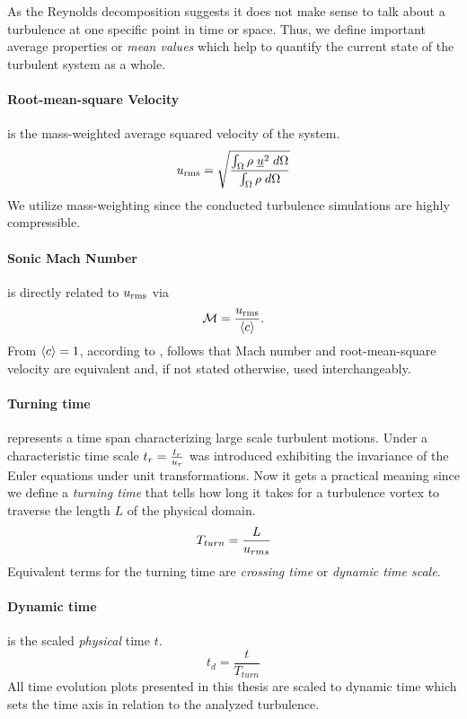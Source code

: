 As the Reynolds decomposition suggests it does not make sense to talk about a
turbulence at one specific point in time or space. Thus, we define important
average properties or \emph{mean values} which help to quantify the current
state of the turbulent system as a whole.

\paragraph{Root-mean-square Velocity}
is the mass-weighted average squared velocity of the system.
\begin{equation}
    u_{\text{rms}} = \sqrt{\frac{\int_\Omega \rho \; \underline{u}^2 \; d\Omega}{\int_\Omega \rho \; d\Omega}}
\end{equation}
We utilize mass-weighting since the conducted turbulence
simulations are highly compressible.

\paragraph{Sonic Mach Number}
is directly related to $u_{\text{rms}}$ via
\begin{equation}
\mathcal{M} = \frac{u_{\text{rms}}}{\left\langle c\right\rangle}.
\end{equation}
From $\left\langle c\right\rangle = 1$, according to , follows that
Mach number and root-mean-square velocity are equivalent and, if not stated
otherwise, used interchangeably.

\paragraph{Turning time}
represents a time span characterizing large scale turbulent motions. Under
 a characteristic time scale $t_r =
\frac{l_r}{u_r}$ was introduced exhibiting the invariance of the Euler equations 
under unit transformations. Now it gets a practical meaning since we define a
\emph{turning time} that tells how long it takes for a turbulence vortex to
traverse the length $L$ of the physical domain.
\begin{equation}
\label{eqn:dyn-time}
    T_{turn} = \frac{L}{u_{rms}}
\end{equation}
Equivalent terms for the turning time are \emph{crossing time} or \emph{dynamic
time scale}.

\paragraph{Dynamic time}
is the scaled \emph{physical} time $t$.
\begin{equation}
    t_d = \frac{t}{T_{turn}}
\end{equation}
All time evolution plots presented in this thesis are scaled to dynamic
time which sets the time axis in relation to the analyzed turbulence. 

